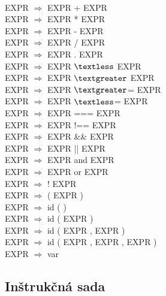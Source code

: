 \documentclass[12pt,a4paper,titlepage,final]{article}
\begin{document}
 \\
EXPR $\Rightarrow$ EXPR + EXPR \\
EXPR $\Rightarrow$ EXPR * EXPR \\
EXPR $\Rightarrow$ EXPR - EXPR \\
EXPR $\Rightarrow$ EXPR / EXPR \\
EXPR $\Rightarrow$ EXPR . EXPR \\
EXPR $\Rightarrow$ EXPR $\textless$ EXPR \\
EXPR $\Rightarrow$ EXPR $\textgreater$ EXPR \\
EXPR $\Rightarrow$ EXPR $\textgreater$= EXPR \\
EXPR $\Rightarrow$ EXPR $\textless$= EXPR \\
EXPR $\Rightarrow$ EXPR === EXPR \\
EXPR $\Rightarrow$ EXPR !== EXPR \\
EXPR $\Rightarrow$ EXPR \&\& EXPR \\
EXPR $\Rightarrow$ EXPR || EXPR \\
EXPR $\Rightarrow$ EXPR and EXPR \\
EXPR $\Rightarrow$ EXPR or EXPR \\
EXPR $\Rightarrow$ ! EXPR \\
EXPR $\Rightarrow$ ( EXPR ) \\
EXPR $\Rightarrow$ id ( ) \\
EXPR $\Rightarrow$ id ( EXPR )  \\
EXPR $\Rightarrow$ id ( EXPR , EXPR ) \\
EXPR $\Rightarrow$ id ( EXPR , EXPR , EXPR ) \\
EXPR $\Rightarrow$ var \\

\subsection{Inštrukčná sada}
\end{document}
